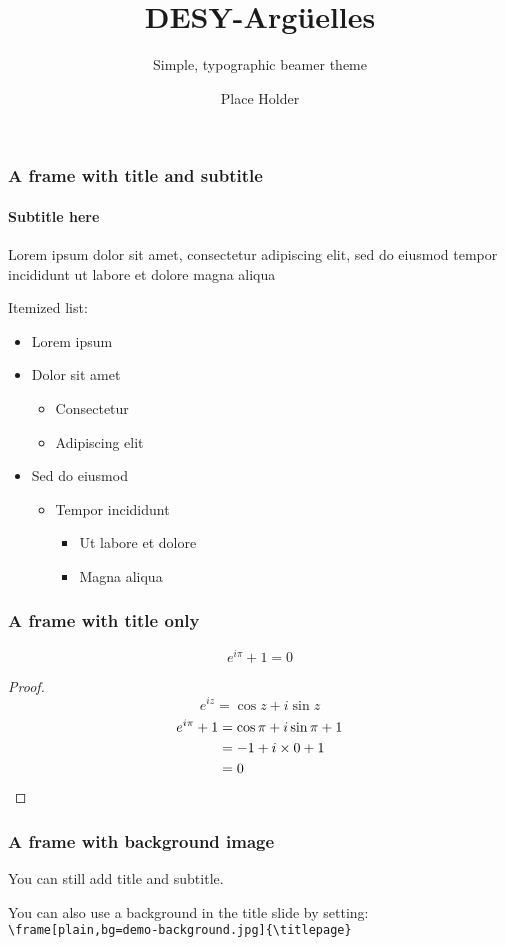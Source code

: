 \documentclass[compress,12pt,aspectratio=169]{beamer}
\title{DESY-Argüelles}
\subtitle{Simple, typographic beamer theme}
\date{}
\author{Place Holder}
\institute{University of \TeX}
\begin{document}
\frame[plain]{\titlepage}


\begin{frame}
	\frametitle{A frame with title and subtitle}
	\framesubtitle{Subtitle here}
	Lorem ipsum dolor sit amet, consectetur adipiscing elit, sed do eiusmod tempor incididunt ut labore et dolore magna aliqua \par
	Itemized list:
	\begin{itemize}
		\item Lorem ipsum
		\item Dolor sit amet
		      \begin{itemize}
			      \item Consectetur
			      \item Adipiscing elit
		      \end{itemize}
		\item Sed do eiusmod
		      \begin{itemize}
			      \item Tempor incididunt
			            \begin{itemize}
				            \item Ut labore et dolore
				            \item Magna aliqua
			            \end{itemize}
		      \end{itemize}
	\end{itemize}
\end{frame}

\begin{frame}
	\frametitle{A frame with title only}
	\begin{theorem}
		\[e^{i\pi}+1=0\]
		\begin{proof}
			\begin{equation*}
				e^{iz}=\cos{z}+i\sin{z}
			\end{equation*}
			\begin{align*}
				e^{i\pi}+1 & \null=\cos\pi+i\sin\pi+1 \\
				           & \null=-1+i\times0+1      \\
				           & \null=0
			\end{align*}
		\end{proof}
	\end{theorem}
\end{frame}

\begin{frame}[bg=demo-arguelles.png]
	\frametitle{A frame with background image}
	You can still add title and subtitle. \par
	You can also use a background in the title slide by setting: \\
	\texttt{\textbackslash frame[plain,bg=demo-background.jpg]\{\textbackslash titlepage\}}
\end{frame}
\end{document}

